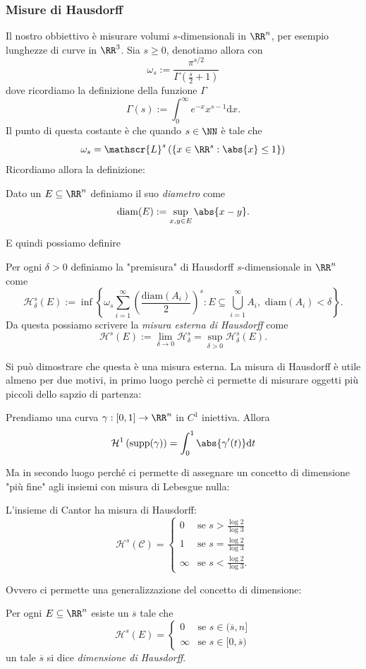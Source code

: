 \documentclass[11pt]{scrartcl}
\newcommand{\dif}{\text{d}}
\begin{document}
	\subsubsection{Misure di Hausdorff}
	Il nostro obbiettivo è misurare volumi $s$-dimensionali in $\RR^n$, per esempio lunghezze di curve in $\RR^3$. Sia $s\ge 0$, denotiamo allora con 
	$$\omega_s:=\frac{\pi^{s/2}}{\Gamma\left(\frac{s}{2}+1\right)}$$
	dove ricordiamo la definizione della funzione $\Gamma$
	$$\Gamma(s):=\int_0^\infty e^{-x}x^{s-1}\dif x.$$
	Il punto di questa costante è che quando $s\in \NN$ è tale che
	$$\omega_s=\mathscr{L}^s\left(\left\{x\in \RR^s:\abs{x}\le 1\right\}\right)$$
	Ricordiamo allora la definizione:
	\begin{definition}[Diametro]
		Dato un $E\subseteq \RR^n$ definiamo il suo \textit{diametro} come
		$$\text{diam}(E):=\sup_{x,y\in E}\abs{x-y}.$$
	\end{definition}
	E quindi possiamo definire
	\begin{definition}
		Per ogni $\delta>0$ definiamo la "premisura" di Hausdorff $s$-dimensionale in $\RR^n$ come
		$$\mathcal{H}_\delta^s(E):=\inf\left\{\omega_s\sum_{i=1}^{\infty}\left(\frac{\text{diam}(A_i)}{2}\right)^s:E\subseteq \bigcup_{i=1}^\infty A_i,\,\,\text{diam}(A_i)<\delta\right\}.$$
		Da questa possiamo scrivere la \textit{misura esterna di Hausdorff} come
		$$\mathcal{H}^s(E):=\lim_{\delta\to 0}\mathcal{H}_\delta^s=\sup_{\delta>0}\mathcal{H}^s_\delta(E).$$
	\end{definition}
	Si può dimostrare che questa è una misura esterna. La misura di Hausdorff è utile almeno per due motivi, in primo luogo perchè ci permette di misurare oggetti più piccoli dello sapzio di partenza:
	\begin{example}
		Prendiamo una curva $\gamma:[0,1]\to \RR^n$ in $C^1$ iniettiva. Allora
		$$\mathcal{H}^1\left(\text{supp}(\gamma)\right)=\int_0^1\abs{\gamma'(t)}\dif t$$
	\end{example}
	Ma in secondo luogo perché ci permette di assegnare un concetto di dimensione "più fine" agli insiemi con misura di Lebesgue nulla:
	\begin{example}
		L'insieme di Cantor ha misura di Hausdorff:
		$$
		\mathcal{H}^s(\mathcal{C})=
		\begin{cases}
			0 & \text{se $s>\frac{\log 2}{\log 3}$} \\
			1 & \text{se $s=\frac{\log 2}{\log 3}$} \\
			\infty & \text{se $s<\frac{\log 2}{\log 3}$.}
		\end{cases}
		$$
	\end{example}
	Ovvero ci permette una generalizzazione del concetto di dimensione:
	\begin{definition}
		Per ogni $E\subseteq \RR^n$ esiste un $\overline{s}$ tale che 
		$$\mathcal{H}^s(E)=
		\begin{cases}
			0 & \text{se $s\in (\overline{s},n]$} \\
			\infty & \text{se $s\in [0,\overline{s})$}
		\end{cases}
		$$
		un tale $\overline{s}$ si dice \textit{dimensione di Hausdorff}.
	\end{definition}
	
\end{document}
